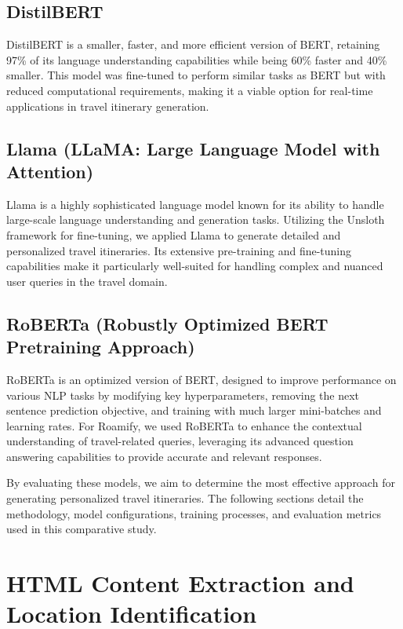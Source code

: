 \documentclass[conference]{IEEEtran}
\begin{document}
    \subsection{DistilBERT}
        DistilBERT is a smaller, faster, and more efficient version of BERT, retaining 97\% of its language understanding capabilities while being 60\% faster and 40\% smaller. This model was fine-tuned to perform similar tasks as BERT but with reduced computational requirements, making it a viable option for real-time applications in travel itinerary generation.

    \subsection{Llama (LLaMA: Large Language Model with Attention)}
        Llama is a highly sophisticated language model known for its ability to handle large-scale language understanding and generation tasks. Utilizing the Unsloth framework for fine-tuning, we applied Llama to generate detailed and personalized travel itineraries. Its extensive pre-training and fine-tuning capabilities make it particularly well-suited for handling complex and nuanced user queries in the travel domain.

    \subsection{RoBERTa (Robustly Optimized BERT Pretraining Approach)}
        RoBERTa is an optimized version of BERT, designed to improve performance on various NLP tasks by modifying key hyperparameters, removing the next sentence prediction objective, and training with much larger mini-batches and learning rates. For Roamify, we used RoBERTa to enhance the contextual understanding of travel-related queries, leveraging its advanced question answering capabilities to provide accurate and relevant responses.

    By evaluating these models, we aim to determine the most effective approach for generating personalized travel itineraries. The following sections detail the methodology, model configurations, training processes, and evaluation metrics used in this comparative study.


\section{HTML Content Extraction and Location Identification}
\end{document}

